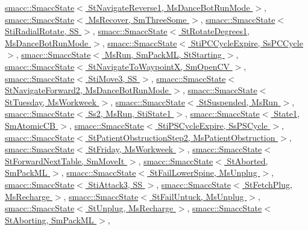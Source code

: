 \hyperlink{classsmacc_1_1SmaccState_afc39f8e0ca4001b2159a100da2fccd0e}{smacc\+::\+Smacc\+State$<$ St\+Navigate\+Reverse1, Ms\+Dance\+Bot\+Run\+Mode $>$}, \hyperlink{classsmacc_1_1SmaccState_afc39f8e0ca4001b2159a100da2fccd0e}{smacc\+::\+Smacc\+State$<$ Ms\+Recover, Sm\+Three\+Some $>$}, \hyperlink{classsmacc_1_1SmaccState_afc39f8e0ca4001b2159a100da2fccd0e}{smacc\+::\+Smacc\+State$<$ Sti\+Radial\+Rotate, S\+S $>$}, \hyperlink{classsmacc_1_1SmaccState_afc39f8e0ca4001b2159a100da2fccd0e}{smacc\+::\+Smacc\+State$<$ St\+Rotate\+Degrees1, Ms\+Dance\+Bot\+Run\+Mode $>$}, \hyperlink{classsmacc_1_1SmaccState_afc39f8e0ca4001b2159a100da2fccd0e}{smacc\+::\+Smacc\+State$<$ Sti\+P\+C\+Cycle\+Expire, Ss\+P\+C\+Cycle $>$}, \hyperlink{classsmacc_1_1SmaccState_afc39f8e0ca4001b2159a100da2fccd0e}{smacc\+::\+Smacc\+State$<$ Ms\+Run, Sm\+Pack\+M\+L, St\+Starting $>$}, \hyperlink{classsmacc_1_1SmaccState_afc39f8e0ca4001b2159a100da2fccd0e}{smacc\+::\+Smacc\+State$<$ St\+Navigate\+To\+Waypoint\+X, Sm\+Open\+C\+V $>$}, \hyperlink{classsmacc_1_1SmaccState_afc39f8e0ca4001b2159a100da2fccd0e}{smacc\+::\+Smacc\+State$<$ Sti\+Move3, S\+S $>$}, \hyperlink{classsmacc_1_1SmaccState_afc39f8e0ca4001b2159a100da2fccd0e}{smacc\+::\+Smacc\+State$<$ St\+Navigate\+Forward2, Ms\+Dance\+Bot\+Run\+Mode $>$}, \hyperlink{classsmacc_1_1SmaccState_afc39f8e0ca4001b2159a100da2fccd0e}{smacc\+::\+Smacc\+State$<$ St\+Tuesday, Ms\+Workweek $>$}, \hyperlink{classsmacc_1_1SmaccState_afc39f8e0ca4001b2159a100da2fccd0e}{smacc\+::\+Smacc\+State$<$ St\+Suspended, Ms\+Run $>$}, \hyperlink{classsmacc_1_1SmaccState_afc39f8e0ca4001b2159a100da2fccd0e}{smacc\+::\+Smacc\+State$<$ Ss2, Ms\+Run, Sti\+State1 $>$}, \hyperlink{classsmacc_1_1SmaccState_afc39f8e0ca4001b2159a100da2fccd0e}{smacc\+::\+Smacc\+State$<$ State1, Sm\+Atomic\+C\+B $>$}, \hyperlink{classsmacc_1_1SmaccState_afc39f8e0ca4001b2159a100da2fccd0e}{smacc\+::\+Smacc\+State$<$ Sti\+P\+S\+Cycle\+Expire, Ss\+P\+S\+Cycle $>$}, \hyperlink{classsmacc_1_1SmaccState_afc39f8e0ca4001b2159a100da2fccd0e}{smacc\+::\+Smacc\+State$<$ St\+Patient\+Obstruction\+Step2, Ms\+Patient\+Obstruction $>$}, \hyperlink{classsmacc_1_1SmaccState_afc39f8e0ca4001b2159a100da2fccd0e}{smacc\+::\+Smacc\+State$<$ St\+Friday, Ms\+Workweek $>$}, \hyperlink{classsmacc_1_1SmaccState_afc39f8e0ca4001b2159a100da2fccd0e}{smacc\+::\+Smacc\+State$<$ St\+Forward\+Next\+Table, Sm\+Move\+It $>$}, \hyperlink{classsmacc_1_1SmaccState_afc39f8e0ca4001b2159a100da2fccd0e}{smacc\+::\+Smacc\+State$<$ St\+Aborted, Sm\+Pack\+M\+L $>$}, \hyperlink{classsmacc_1_1SmaccState_afc39f8e0ca4001b2159a100da2fccd0e}{smacc\+::\+Smacc\+State$<$ St\+Fail\+Lower\+Spine, Ms\+Unplug $>$}, \hyperlink{classsmacc_1_1SmaccState_afc39f8e0ca4001b2159a100da2fccd0e}{smacc\+::\+Smacc\+State$<$ Sti\+Attack3, S\+S $>$}, \hyperlink{classsmacc_1_1SmaccState_afc39f8e0ca4001b2159a100da2fccd0e}{smacc\+::\+Smacc\+State$<$ St\+Fetch\+Plug, Ms\+Recharge $>$}, \hyperlink{classsmacc_1_1SmaccState_afc39f8e0ca4001b2159a100da2fccd0e}{smacc\+::\+Smacc\+State$<$ St\+Fail\+Untuck, Ms\+Unplug $>$}, \hyperlink{classsmacc_1_1SmaccState_afc39f8e0ca4001b2159a100da2fccd0e}{smacc\+::\+Smacc\+State$<$ St\+Unplug, Ms\+Recharge $>$}, \hyperlink{classsmacc_1_1SmaccState_afc39f8e0ca4001b2159a100da2fccd0e}{smacc\+::\+Smacc\+State$<$ St\+Aborting, Sm\+Pack\+M\+L $>$}, 